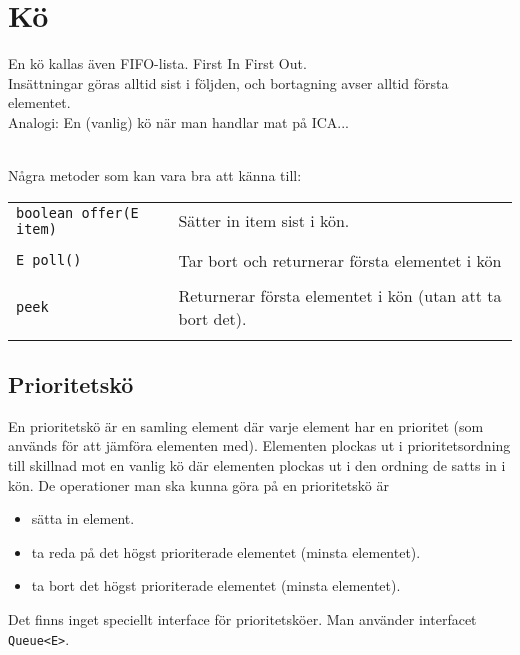\documentclass[11pt]{article}
\begin{document}
\section{Kö}
En kö kallas även FIFO-lista. First In First Out. \\
Insättningar göras alltid sist i följden, och bortagning avser alltid första elementet. \\
Analogi: En (vanlig) kö när man handlar mat på ICA...
\begin{figure}[h]
  \begin{center}
  \end{center}
  \label{bild1}
\end{figure}
\\
Några metoder som kan vara bra att känna till: \\
\begin{tabular}{l|l}
\hline
	\verb+boolean offer(E item)+	&	Sätter in item sist i kön. \\  \\
	\verb+E poll()+	&	Tar bort och returnerar första elementet i kön \\ \\
	\verb+peek+		&	Returnerar första elementet i kön (utan att ta bort det). \\ \\
\hline	
\end{tabular}


\subsection{Prioritetskö}
En prioritetskö är en samling element där varje element har en prioritet (som används för
att jämföra elementen med). Elementen plockas ut i prioritetsordning till skillnad mot en
vanlig kö där elementen plockas ut i den ordning de satts in i kön.
De operationer man ska kunna göra på en prioritetskö är
\begin{itemize}
\item{sätta in element.}
\item{ta reda på det högst prioriterade elementet (minsta elementet).}
\item{ta bort det högst prioriterade elementet (minsta elementet).}
\end{itemize}

Det finns inget speciellt interface för prioritetsköer. Man använder interfacet \verb+Queue<E>+.
\end{document}
